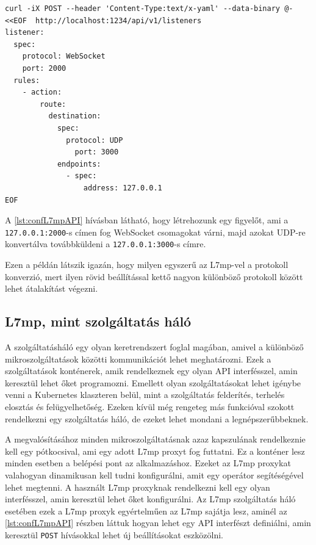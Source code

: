 \begin{lstlisting}[caption=L7mp konfigurálása API-n keresztül, label=lst:confL7mpAPI]
curl -iX POST --header 'Content-Type:text/x-yaml' --data-binary @- <<EOF  http://localhost:1234/api/v1/listeners
listener:
  spec:
    protocol: WebSocket
    port: 2000
  rules:
    - action:
        route:
          destination:
            spec:
              protocol: UDP
                port: 3000
            endpoints:
              - spec:
                  address: 127.0.0.1
EOF
\end{lstlisting}

A \ref{lst:confL7mpAPI} hívásban látható, hogy létrehozunk egy figyelőt, ami a 
\texttt{127.0.0.1:2000}-s címen fog WebSocket csomagokat várni, majd azokat UDP-re 
konvertálva továbbküldeni a \texttt{127.0.0.1:3000}-s címre.

Ezen a példán látszik igazán, hogy milyen egyszerű az L7mp-vel a protokoll konverzió,
mert ilyen rövid beállítással kettő nagyon különböző protokoll között lehet 
átalakítást végezni.

\subsection{L7mp, mint szolgáltatás háló}

A szolgáltatásháló egy olyan keretrendszert foglal magában, amivel a különböző 
mikroszolgáltatások közötti kommunikációt lehet meghatározni. Ezek a szolgáltatások 
konténerek, amik rendelkeznek egy olyan API interfésszel, amin keresztül lehet 
őket programozni. Emellett olyan szolgáltatásokat lehet igénybe venni a Kubernetes 
klaszteren belül, mint a szolgáltatás felderítés, terhelés elosztás és felügyelhetőség. 
Ezeken kívül még rengeteg más funkcióval szokott rendelkezni egy szolgáltatás háló, de 
ezeket lehet mondani a legnépszerűbbeknek.

A megvalósításához minden mikroszolgáltatásnak azaz kapszulának rendelkeznie kell 
egy pótkocsival, ami egy adott L7mp proxyt fog futtatni. Ez a konténer lesz minden esetben
a belépési pont az alkalmazáshoz. Ezeket az L7mp proxykat valahogyan dinamikusan kell 
tudni konfigurálni, amit egy operátor segítéségével lehet megtenni. A használt L7mp 
proxyknak rendelkezni kell egy olyan interfésszel, amin keresztül lehet őket 
konfigurálni. Az L7mp szolgáltatás háló esetében ezek a L7mp proxyk egyértelműen az L7mp 
sajátja lesz, aminél az \ref{lst:confL7mpAPI} részben láttuk hogyan lehet egy API 
interfészt definiálni, amin keresztül \texttt{POST} hívásokkal lehet új beállításokat 
eszközölni.

